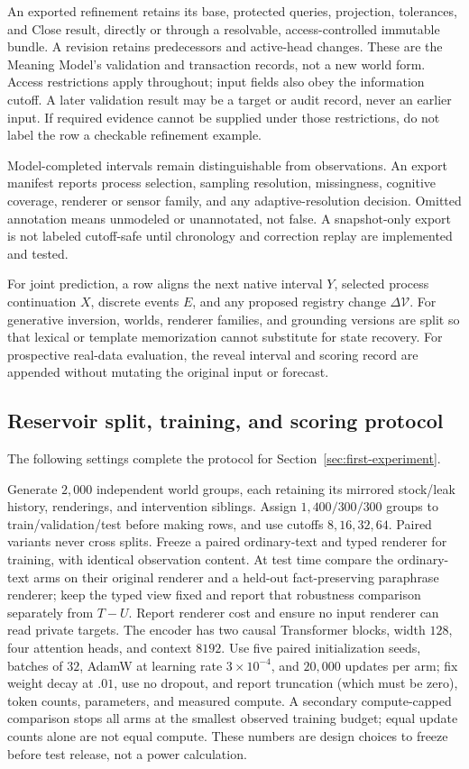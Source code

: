 \documentclass[10pt]{article}
\begin{document}
An exported refinement retains its base, protected queries, projection,
tolerances, and Close result, directly or through a resolvable, access-controlled
immutable bundle. A revision retains predecessors and active-head changes.
These are the Meaning Model's validation and transaction records, not a new
world form. Access restrictions apply throughout; input fields also obey the
information cutoff. A later validation result may be a target or audit record, never an earlier
input. If required evidence cannot be supplied under those restrictions, do
not label the row a checkable refinement example.

Model-completed intervals remain distinguishable from observations. An export
manifest reports process selection, sampling resolution, missingness, cognitive
coverage, renderer or sensor family, and any adaptive-resolution decision.
Omitted annotation means unmodeled or unannotated, not false. A snapshot-only
export is not labeled cutoff-safe until chronology and correction replay are
implemented and tested.

For joint prediction, a row aligns the next native interval $Y$, selected
process continuation $X$, discrete events $E$, and any proposed registry change
$\Delta\mathcal V$. For generative inversion, worlds, renderer families, and
grounding versions are split so that lexical or template memorization cannot
substitute for state recovery. For prospective real-data evaluation, the reveal
interval and scoring record are appended without mutating the original input or
forecast.

\subsection{Reservoir split, training, and scoring protocol}
\label{app:reservoir-protocol}

The following settings complete the protocol for
Section~\ref{sec:first-experiment}.

Generate $2{,}000$ independent world groups, each retaining its mirrored
stock/leak history, renderings, and intervention siblings. Assign
$1{,}400/300/300$ groups to train/validation/test before making rows, and use
cutoffs $8,16,32,64$. Paired variants never cross splits. Freeze a paired
ordinary-text and typed renderer for training, with identical observation
content. At test time compare the ordinary-text arms on their original
renderer and a held-out fact-preserving paraphrase renderer; keep the typed
view fixed and report that robustness comparison separately from $T-U$.
Report renderer cost and ensure no input renderer can read private targets.
The encoder has two causal Transformer blocks, width $128$, four
attention heads, and context $8192$. Use five paired initialization seeds, batches of
$32$, AdamW at learning rate $3\times10^{-4}$, and $20{,}000$ updates per arm;
fix weight decay at $.01$, use no dropout, and report truncation (which must
be zero), token counts, parameters, and measured compute. A secondary
compute-capped comparison stops all arms at the smallest observed training
budget; equal update counts alone are not equal compute. These numbers are
design choices to freeze before test release, not a power calculation.
\end{document}
